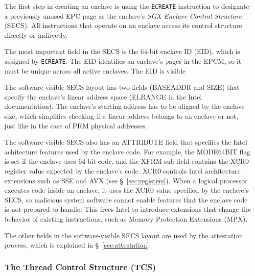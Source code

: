 
The first step in creating an enclave is using the \texttt{ECREATE} instruction
to designate a previously unused EPC page as the enclave's \textit{SGX Enclave
Control Structure} (SECS). All instructions that operate on an enclave access
its control structure directly or indirectly.

The most important field in the SECS is the 64-bit enclave ID (EID), which is
assigned by \texttt{ECREATE}. The EID identifies an enclave's pages in the
EPCM, so it must be unique across all active enclaves. The EID is visible

The software-visible SECS layout has two fields (BASEADDR and SIZE) that
specify the enclave's linear address space (ELRANGE in the Intel
documentation). The enclave's starting address has to be aligned by the enclave
size, which simplifies checking if a linear address belongs to an enclave or
not, just like in the case of PRM physical addresses.


The software-visible SECS also has an ATTRIBUTE field that specifies the Intel
achitecture features used by the enclave code. For example, the MODE64BIT flag
is set if the enclave uses 64-bit code, and the XFRM sub-field contains the
XCR0 register value expected by the enclave's code. XCR0 controls Intel
architecture extensions such as SSE and AVX (see \S~\ref{sec:registers}). When
a logical processor executes code inside an enclave, it uses the XCR0 value
specified by the enclave's SECS, so malicious system software cannot enable
features that the enclave code is not prepared to handle. This frees Intel to
introduce extensions that change the behavior of existing instructions, such as
Memory Protection Extensions (MPX).

The other fields in the software-visible SECS layout are used by the
attestation process, which is explained in \S~\ref{sec:attestation}.

\subsubsection{The Thread Control Structure (TCS)}
\label{sec:tcs}


